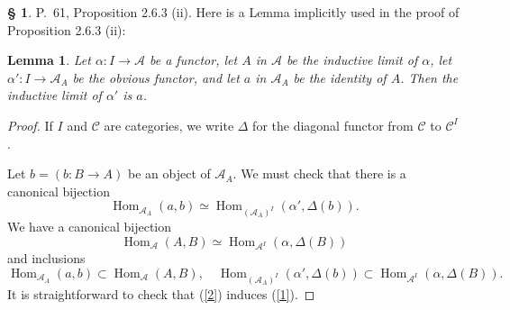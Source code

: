 \documentclass[12pt]{article}%
\newtheorem{lem}[thm]{Lemma}
\theoremstyle{remark}
\theoremstyle{definition}
\newtheorem{s}[thm]{\S}%
\newcommand{\A}{\mathcal A}
\newcommand{\C}{\mathcal C}
\DeclareMathOperator{\Hom}{Hom}%
\begin{document}
\begin{s} 
P.~61, Proposition 2.6.3 (ii). Here is a Lemma implicitly used in the proof of Proposition 2.6.3 (ii): 

\begin{lem} 
Let $\alpha:I\to\A$ be a functor, let $A$ in $\A$ be the inductive limit of $\alpha$, let $\alpha':I\to\A_A$ be the obvious functor, and let $a$ in $\A_A$ be the identity of $A$. Then the inductive limit of $\alpha'$ is $a$. 
\end{lem} 

\begin{proof}
If $I$ and $\C$ are categories, we write $\Delta$ for the diagonal functor from $\C$ to $\C^I$. 

Let $b=(b:B\to A)$ be an object of $\A_A$. We must check that there is a canonical bijection
%
\begin{equation}\label{1}
\Hom_{\A_A}(a,b)\simeq\Hom_{(\A_A)^I}(\alpha',\Delta(b)).
\end{equation}
%
We have a canonical bijection
%
\begin{equation}\label{2}
\Hom_\A(A,B)\simeq\Hom_{\A^I}(\alpha,\Delta(B))
\end{equation}
%
and inclusions 
$$
\Hom_{\A_A}(a,b)\subset\Hom_\A(A,B),\quad
%
\Hom_{(\A_A)^I}(\alpha',\Delta(b))\subset\Hom_{\A^I}(\alpha,\Delta(B)).
$$
It is straightforward to check that (\ref{2}) induces (\ref{1}).
\end{proof}
\end{s}

%
\end{document}
